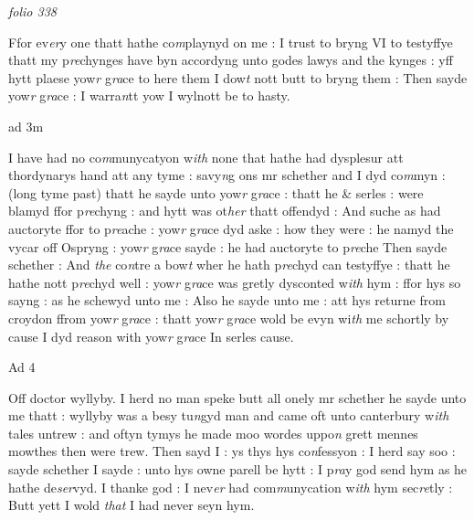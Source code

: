 \documentclass[12pt, a4paper]{book}
\begin{document}
\dotfill
						\newpage
{}

\textit{folio 338}


 	
		\ifthenelse{\isodd{\thepage}}
		{\reversemarginpar}
		{\normalmarginpar}
		Ffor ev\textit{er}y one thatt hathe co\textit{m}playnyd on me : I trust to bryng VI
to testyffye thatt my p\textit{re}chynges have byn accordyng unto godes
lawys and the kynges : yff hytt plaese yow\textit{r} g\textit{ra}ce to here them
I dow\textit{t} nott butt to bryng them : Then sayde yow\textit{r} g\textit{ra}ce : I
warra\textit{n}tt yow I wylnott be to hasty.

 	
		\ifthenelse{\isodd{\thepage}}
		{\reversemarginpar}
		{\normalmarginpar}
		ad 3m
 		
		\ifthenelse{\isodd{\thepage}}
		{\reversemarginpar}
		{\normalmarginpar}
		I have had no co\textit{m}munycatyon w\textit{ith} none that hathe had dysplesur
att thordynarys hand att any tyme : savy\textit{n}g ons mr schether
and I dyd co\textit{m}myn : (long tyme past) thatt he sayde unto 
yow\textit{r} g\textit{ra}ce : thatt he \& serles : were blamyd ffor p\textit{re}chyng : and
hytt was ot\textit{her} thatt offendyd : And suche as had auctoryte ffor
to p\textit{re}ache : yow\textit{r} g\textit{ra}ce dyd aske : how they were : he namyd the
vycar off Ospryng : yow\textit{r} g\textit{ra}ce sayde : he had auctoryte to p\textit{re}che
Then sayde schether : And \textit{the} co\textit{n}tre a bow\textit{t} wher he hath
p\textit{re}chyd can testyffye : thatt he hathe nott p\textit{re}chyd well : yow\textit{r}
g\textit{ra}ce was gretly dysconted w\textit{ith} hym : ffor hys so sayng : as he schewyd
unto me : Also he sayde unto me : att hys returne from croydon
ffrom yow\textit{r} g\textit{ra}ce : thatt yow\textit{r }g\textit{ra}ce wold be evyn wi\textit{th} me schortly
by cause I dyd reason with yow\textit{r} g\textit{ra}ce In serles cause. 

 	
		\ifthenelse{\isodd{\thepage}}
		{\reversemarginpar}
		{\normalmarginpar}
		Ad 4

 		
		\ifthenelse{\isodd{\thepage}}
		{\reversemarginpar}
		{\normalmarginpar}
		Off doctor wyllyby. I herd no man speke butt all onely mr schether
he sayde unto me thatt : wyllyby was a besy tu\textit{n}gyd man and
came oft unto canterbury w\textit{ith} tales untrew : and oftyn tymys he
made moo wordes uppo\textit{n} grett mennes mowthes then were trew. Then
sayd I : ys thys hys co\textit{n}fessyon : I herd say soo : sayde schether
I sayde : unto hys owne parell be hytt : I p\textit{ra}y god send hym
as he hathe de\textit{ser}vyd. I thanke god : I nev\textit{er} had com\textit{m}unycation
w\textit{ith} hym sec\textit{re}tly : Butt yett I wold \textit{that }I had never seyn hym.
\end{document}
